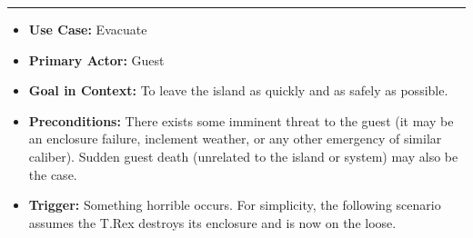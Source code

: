 \documentclass[12pt]{article}
\begin{document}
    \par\noindent\rule{\textwidth}{0.4pt}    
    \begin{itemize}
        \item[]\textbf{Use Case:}                                
            Evacuate

        \item[]\textbf{Primary Actor:}
            Guest

        \item[]\textbf{Goal in Context:}
            To leave the island as quickly and as safely as possible.

        \item[]\textbf{Preconditions:}
            There exists some imminent threat to the guest (it may be an enclosure failure, inclement 
            weather, or any other emergency of similar caliber). Sudden guest death (unrelated to the
            island or system) may also be the case.

        \item[]\textbf{Trigger:}
            Something horrible occurs. For simplicity, the following scenario assumes the T.Rex destroys
            its enclosure and is now on the loose.


\end{itemize}
\end{document}
